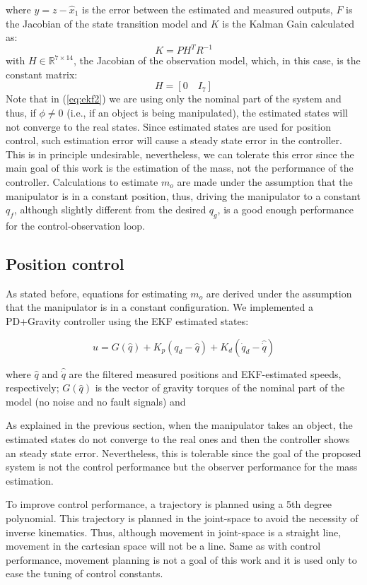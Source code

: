 \documentclass[a4paper, 10pt]{article}
\begin{document}
where $y=z - \hat{x}_1$ is the error between the estimated and measured outputs, $F$ is the Jacobian of the state transition model and $K$ is the Kalman Gain calculated as:
\[
K = PH^TR^{-1}
\]
with $H\in\mathbb{R}^{7\times 14}$, the Jacobian of the observation model, which, in this case, is the constant matrix:
\[
H = \left[0\quad I_7\right]
\]
Note that in (\ref{eq:ekf2}) we are using only the nominal part of the system and thus, if $\phi\neq 0$ (i.e., if an object is being manipulated), the estimated states will not converge to the real states. Since estimated states are used for position control, such estimation error will cause a steady state error in the controller. This is in principle undesirable, nevertheless, we can tolerate this error since the main goal of this work is the estimation of the mass, not the performance of the controller. Calculations to estimate $m_o$ are made under the assumption that the manipulator is in a constant position, thus, driving the manipulator to a constant $q_f$, although slightly different from the desired $q_g$, is a good enough performance for the control-observation loop. 
\subsection{Position control}
As stated before, equations for estimating $m_o$ are derived under the assumption that the manipulator is in a constant configuration. We implemented a PD+Gravity controller using the EKF estimated states:

\begin{equation}
  u = G(\hat{q}) + K_p(q_d - \hat{q}) + K_d(\dot{q}_d - \hat{\dot{q}})
\end{equation}

where $\hat{q}$ and $\hat{\dot{q}}$ are the filtered measured positions and EKF-estimated speeds, respectively; $G(\hat{q})$ is the vector of gravity torques of the nominal part of the model (no noise and no fault signals) and 

As explained in the previous section, when the manipulator takes an object, the estimated states do not converge to the real ones and then the controller shows an steady state error. Nevertheless, this is tolerable since the goal of the proposed system is not the control performance but the observer performance for the mass estimation.

To improve control performance, a trajectory is planned using a 5th degree polynomial. This trajectory is planned in the joint-space to avoid the necessity of inverse kinematics. Thus, although movement in joint-space is a straight line, movement in the cartesian space will not be a line. Same as with control performance, movement planning is not a goal of this work and it is used only to ease the tuning of control constants.
\end{document}

